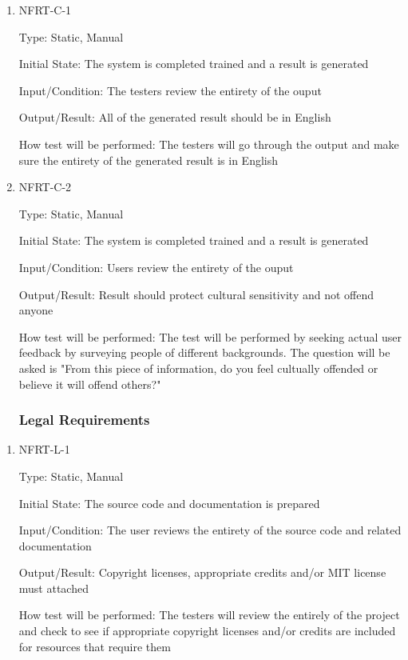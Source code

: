 \documentclass[12pt, titlepage]{article}
\begin{document}
\begin{enumerate}

\item{NFRT-C-1\\}

Type: Static, Manual
					
Initial State: The system is completed trained and a result is generated
					
Input/Condition: The testers review the entirety of the ouput
					
Output/Result: All of the generated result should be in English 
					
How test will be performed: The testers will go through the output and make sure the entirety of the generated result is in English


\item{NFRT-C-2\\}

Type: Static, Manual
					
Initial State: The system is completed trained and a result is generated
					
Input/Condition: Users review the entirety of the ouput
					
Output/Result: Result should protect cultural sensitivity and not offend anyone
					
How test will be performed: The test will be performed by seeking actual user feedback by surveying people of different backgrounds. The question will be asked is "From this piece of information, do you feel cultually offended or believe it will offend others?" 

\subsubsection{Legal Requirements}

\end{enumerate}
\begin{enumerate}

\item{NFRT-L-1\\}

Type: Static, Manual
					
Initial State: The source code and documentation is prepared
					
Input/Condition: The user reviews the entirety of the source code and related documentation
					
Output/Result: Copyright licenses, appropriate credits and/or MIT license must attached
					
How test will be performed: The testers will review the entirely of the project and check to see if appropriate copyright licenses and/or credits are included for resources that require them

\end{enumerate}
\end{document}
